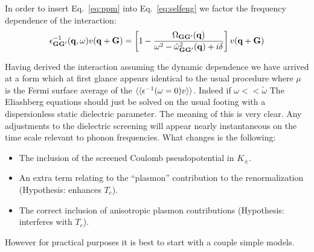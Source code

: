In order to insert Eq.~\ref{eq:ppm} into Eq.~\ref{eq:selfeng} we factor the frequency dependence of the interaction:
%
\begin{equation}
\epsilon_{{\bf G}{\bf G}'}^{-1}({\bf q},\omega)v({\bf q}+{\bf G}) = \left[1- \frac{\Omega_{{\bf G}{\bf G}'}({\bf q})}{\omega^{2}-\tilde{\omega}^{2}_{{\bf G}{\bf G}'}({\bf q}) + i\delta}\right]v({\bf q}+{\bf G})
\end{equation}

Having derived the interaction assuming the dynamic dependence we have arrived at a form 
which at first glance appears identical to the usual procedure where $\mu$ is the Fermi
surface average of the $\langle \langle \epsilon^{-1}(\omega=0)v\rangle \rangle$. Indeed if $\omega << \tilde{\omega}$
The Eliashberg equations should just be solved on the usual footing with a dispersionless static dielectric
parameter. The meaning of this is very clear. Any adjustments to the dielectric 
screening will appear nearly instantaneous on the time scale relevant to phonon frequencies.
What changes is the following: 
%
\begin {itemize}
\item The inclusion of the screened Coulomb pseudopotential in $K_{\pm}$.
\item An extra term relating to the ``plasmon'' contribution to the renormalization (Hypothesis: enhances $T_{c}$).
\item The correct inclusion of anisotropic plasmon contributions (Hypothesis: interferes with $T_c$).
\end {itemize}
%
%
%

However for practical purposes it is best to start with a couple simple models.


